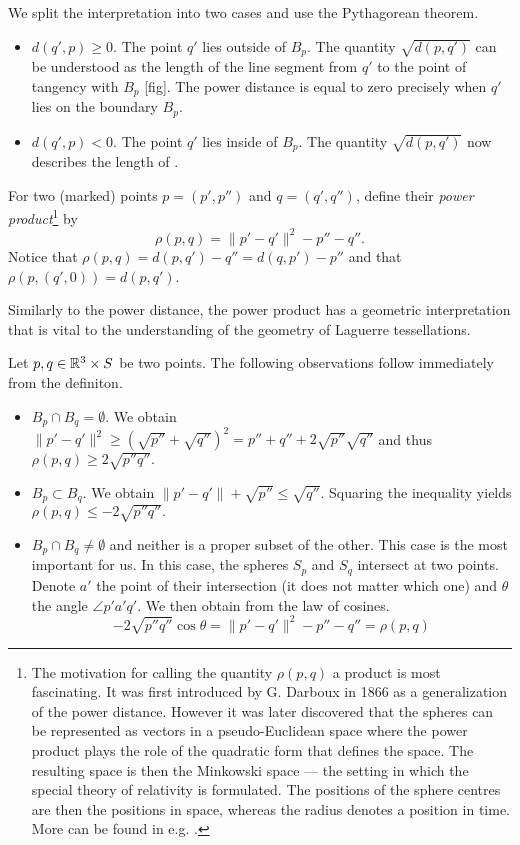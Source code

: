\begin{remark}
We split the interpretation into two cases and use the Pythagorean theorem.
\begin{itemize}
	\item $d(q',p) \geq 0$. The point $q'$ lies outside of $B_p$. The quantity $\sqrt{d(p,q')}$ can be understood as the length of the line segment from $q'$ to the point of tangency with $B_p$ [fig]. The power distance is equal to zero precisely when $q'$ lies on the boundary $B_p$.
	\item $d(q',p) < 0$. The point $q'$ lies inside of $B_p$. The quantity $\sqrt{d(p,q')}$ now describes the length of . 
\end{itemize}
\end{remark}

\begin{definition}
	For two (marked) points $p=(p',p'')$ and $q=(q',q'')$, define their \textit{power product}\footnote{ The motivation for calling the quantity $\rho(p,q)$ a product is most fascinating. It was first introduced by G. Darboux in 1866 as a generalization of the power distance. However it was later discovered that the spheres can be represented as vectors in a pseudo-Euclidean space where the power product plays the role of the quadratic form that defines the space. The resulting space is then the Minkowski space --- the setting in which the special theory of relativity is formulated. The positions of the sphere centres are then the positions in space, whereas the radius denotes a position in time. More can be found in e.g. \cite{Kocik2007}.} by 
$$\rho(p,q) = \|p'-q'\|^2 - p'' - q''.$$
Notice that $\rho(p,q) = d(p,q') - q'' = d(q,p') - p''$ and that $\rho(p,(q',0)) = d(p,q')$.
\end{definition}

Similarly to the power distance, the power product has a geometric interpretation that is vital to the understanding of the geometry of Laguerre tessellations.

Let $p,q \in {\mathbb R^3}\times S$ be two points. The following observations follow immediately from the definiton. 
\begin{itemize}
	\item $B_p\cap B_q = \emptyset$. We obtain $\|p'-q'\|^2 \geq (\sqrt{p''} + \sqrt{q''})^2 = p'' + q'' + 2\sqrt{p''}\sqrt{q''}$ and thus $\rho(p,q) \geq 2\sqrt{p'' q''}.$ 
	\item $B_p \subset B_q$. We obtain $\|p'-q'\| + \sqrt{p''} \leq \sqrt{q''} $. Squaring the inequality yields $\rho(p,q) \leq -2\sqrt{p'' q''}.$ 
	\item $B_p \cap B_q \neq \emptyset$ and neither is a proper subset of the other. This case is the most important for us. In this case, the spheres $S_p$ and $S_q$ intersect at two points. Denote $a'$ the point of their intersection (it does not matter which one) and $\theta$ the angle $\angle p'a'q'$. We then obtain from the law of cosines. 
	$$- 2\sqrt{p'' q''}\cos \theta = \|p'-q'\|^2 - p'' - q'' = \rho(p,q)$$
\end{itemize}

